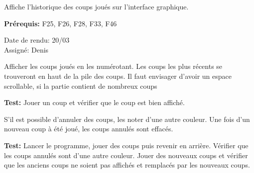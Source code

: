 \documentclass{article}
\begin{document}
\begin{needbox}
    Affiche l'historique des coups joués sur l'interface graphique.

    \textbf{Prérequis:} F25, F26, F28, F33, F46
    \begin{duedatebox}
        Date de rendu: 20/03\\
        Assigné: Denis
    \end{duedatebox}
    \begin{subneedbox}
        Afficher les coups joués en les numérotant. Les coups les plus récents se trouveront
        en haut de la pile des coups. Il faut envisager d'avoir un espace scrollable, si la partie
        contient de nombreux coups

        \textbf{Test:} Jouer un coup et vérifier que le coup est bien affiché.
    \end{subneedbox}
    \begin{subneedbox}
        S'il est possible d'annuler des coups, les noter d'une autre couleur. Une fois d'un
        nouveau coup à été joué, les coups annulés sont effacés.

        \textbf{Test:} Lancer le programme, jouer des coups puis revenir en arrière.
        Vérifier que les coups annulés sont d'une autre couleur. Jouer des nouveaux coups et vérifier que les anciens coups ne soient pas affichés et remplacés par les nouveaux coups.
    \end{subneedbox}
\end{needbox}
\end{document}
